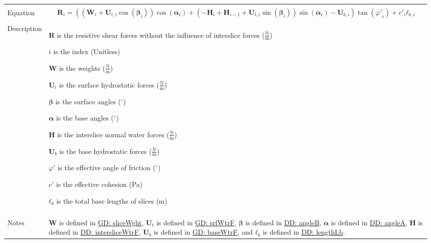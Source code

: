 \documentclass[12pt]{article}
\begin{document}
\begin{minipage}{\textwidth}
\begin{tabular}{>{\raggedright}p{}>{\raggedright\arraybackslash}p{}}
\\ \midrule \\
Equation & \begin{displaymath}
           {\mathbf{R}}_{i}=\left(\left({\mathbf{W}}_{i}+{\mathbf{U}_{t,i}} \cos\left({\mathbf{β}}_{i}\right)\right) \cos\left({\mathbf{α}}_{i}\right)+\left(-{\mathbf{H}}_{i}+{\mathbf{H}}_{i-1}+{\mathbf{U}_{t,i}} \sin\left({\mathbf{β}}_{i}\right)\right) \sin\left({\mathbf{α}}_{i}\right)-{\mathbf{U}_{b,i}}\right) \tan\left({φ'}_{i}\right)+{c'}_{i} {\mathbf{ℓ}_{b,i}}
           \end{displaymath}
\\ \midrule \\
Description & \begin{symbDescription}
              \item{$\mathbf{R}$ is the resistive shear forces without the influence of interslice forces ($\frac{\text{N}}{\text{m}}$)}
              \item{$i$ is the index (Unitless)}
              \item{$\mathbf{W}$ is the weights ($\frac{\text{N}}{\text{m}}$)}
              \item{${\mathbf{U}_{t}}$ is the surface hydrostatic forces ($\frac{\text{N}}{\text{m}}$)}
              \item{$\mathbf{β}$ is the surface angles (${}^{\circ}$)}
              \item{$\mathbf{α}$ is the base angles (${}^{\circ}$)}
              \item{$\mathbf{H}$ is the interslice normal water forces ($\frac{\text{N}}{\text{m}}$)}
              \item{${\mathbf{U}_{b}}$ is the base hydrostatic forces ($\frac{\text{N}}{\text{m}}$)}
              \item{$φ'$ is the effective angle of friction (${}^{\circ}$)}
              \item{$c'$ is the effective cohesion (Pa)}
              \item{${\mathbf{ℓ}_{b}}$ is the total base lengths of slices (m)}
              \end{symbDescription}
\\ \midrule \\
Notes & $\mathbf{W}$ is defined in \hyperref[GD:sliceWght]{GD: sliceWght}, ${\mathbf{U}_{t}}$ is defined in \hyperref[GD:srfWtrF]{GD: srfWtrF}, $\mathbf{β}$ is defined in \hyperref[DD:angleB]{DD: angleB}, $\mathbf{α}$ is defined in \hyperref[DD:angleA]{DD: angleA}, $\mathbf{H}$ is defined in \hyperref[DD:intersliceWtrF]{DD: intersliceWtrF}, ${\mathbf{U}_{b}}$ is defined in \hyperref[GD:baseWtrF]{GD: baseWtrF}, and ${\mathbf{ℓ}_{b}}$ is defined in \hyperref[DD:lengthLb]{DD: lengthLb}.
        

\end{tabular}
\end{minipage}
\end{document}
